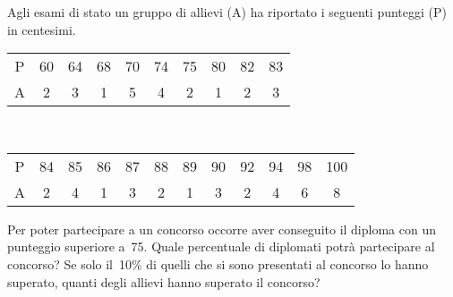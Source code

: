\begin{esercizio}
 \label{ese:3.97}
 Agli esami di stato un gruppo di allievi (A) ha riportato i seguenti 
punteggi  (P) in centesimi.\\ [.5em]
\begin{tabular}{cccccccccc}
\hline
P& 60& 64& 68& 70& 74& 75& 80& 82& 83\\
A& 2& 3& 1& 5& 4& 2& 1& 2& 3\\
\hline
\end{tabular}\\ [.5em]
\begin{tabular}{cccccccccccc}
\hline
P& 84& 85& 86& 87& 88& 89& 90& 92& 94& 
98& 100\\
A& 2& 4& 1& 3& 2& 1& 3& 2& 4& 6& 8\\
\hline
\end{tabular}
\vspace{1em}

Per poter partecipare a un concorso occorre aver conseguito il diploma con 
un  punteggio superiore a~75. Quale percentuale di diplomati
potrà partecipare al concorso? Se solo il~10\% di quelli che si sono 
presentati al concorso lo hanno superato, quanti degli allievi hanno 
superato il concorso?
\end{esercizio}

